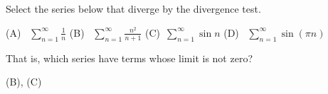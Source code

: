 %
%

\subsection*{\Conceptual}

\begin{Mquestion}
Select the series below that diverge by the divergence test.

\hfill(A)~ $\displaystyle\sum_{n=1}^\infty \frac{1}{n}$ \hfill
\hfill(B)~ $\displaystyle\sum_{n=1}^\infty \frac{n^2}{n+1}$
\hfill (C)~$\displaystyle\sum_{n=1}^\infty \sin n$
\hfill(D)~ $\displaystyle\sum_{n=1}^\infty \sin (\pi n)$\hfill~
\end{Mquestion}
\begin{hint}
That is, which series have terms whose limit is not zero?
\end{hint}
\begin{answer}
(B), (C)
\end{answer}
